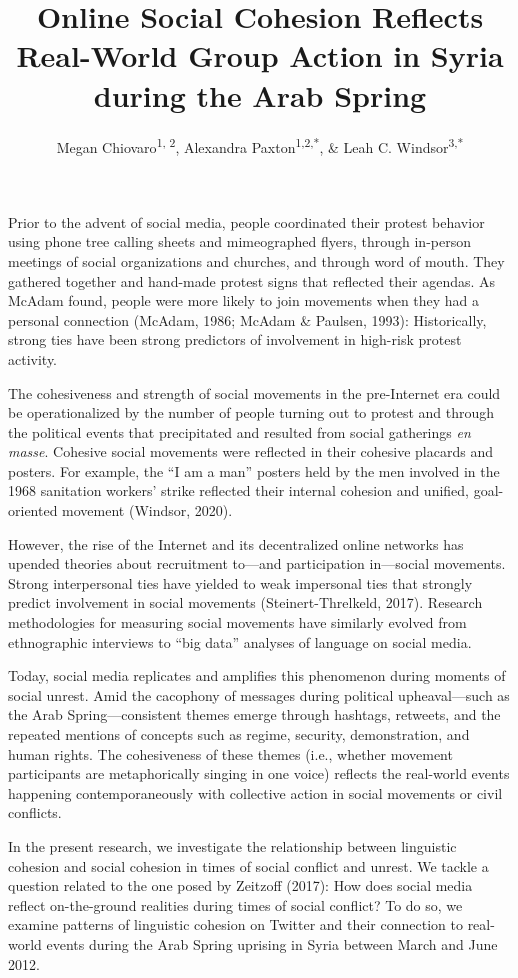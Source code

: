 \documentclass[english,man]{apa6}
\author{Megan Chiovaro\textsuperscript{1, 2}, Alexandra Paxton\textsuperscript{1,2,*}, \& Leah C. Windsor\textsuperscript{3,*}}
\affiliation{
\vspace{0.5cm}
\textsuperscript{1} Center for the Ecological Study of Perception and Action, University of Connecticut\\\textsuperscript{2} Department of Psychological Sciences, University of Connecticut\\\textsuperscript{3} University of Memphis\\\textsuperscript{*} Equal author contributions}
\title{Online Social Cohesion Reflects Real-World Group Action in Syria during the Arab Spring}
\date{}
\begin{document}
\maketitle

Prior to the advent of social media, people coordinated their protest behavior
using phone tree calling sheets and mimeographed flyers, through in-person
meetings of social organizations and churches, and through word of mouth. They
gathered together and hand-made protest signs that reflected their agendas. As
McAdam found, people were more likely to join movements when they had a personal
connection (McAdam, 1986; McAdam \& Paulsen, 1993): Historically, strong
ties have been strong predictors of involvement in high-risk protest activity.

The cohesiveness and strength of social movements in the pre-Internet era could
be operationalized by the number of people turning out to protest and through
the political events that precipitated and resulted from social gatherings \emph{en
masse}. Cohesive social movements were reflected in their cohesive placards and
posters. For example, the \enquote{I am a man} posters held by the men involved in the
1968 sanitation workers' strike reflected their internal cohesion and unified,
goal-oriented movement (Windsor, 2020).

However, the rise of the Internet and its decentralized online networks has
upended theories about recruitment to---and participation in---social movements.
Strong interpersonal ties have yielded to weak impersonal ties that strongly
predict involvement in social movements (Steinert-Threlkeld, 2017). Research
methodologies for measuring social movements have similarly evolved from
ethnographic interviews to \enquote{big data} analyses of language on social media.

Today, social media replicates and amplifies this phenomenon during moments of
social unrest. Amid the cacophony of messages during political upheaval---such
as the Arab Spring---consistent themes emerge through hashtags, retweets, and
the repeated mentions of concepts such as regime, security, demonstration, and
human rights. The cohesiveness of these themes (i.e., whether movement
participants are metaphorically singing in one voice) reflects the real-world
events happening contemporaneously with collective action in social movements or
civil conflicts.

In the present research, we investigate the relationship between linguistic
cohesion and social cohesion in times of social conflict and unrest. We tackle a
question related to the one posed by Zeitzoff (2017): How does
social media reflect on-the-ground realities during times of social conflict? To
do so, we examine patterns of linguistic cohesion on Twitter and their
connection to real-world events during the Arab Spring uprising in Syria between
March and June 2012.
\end{document}
